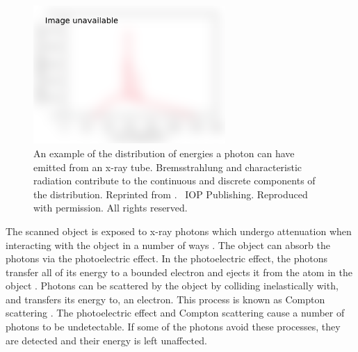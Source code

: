 \begin{figure}
  \centering
  \includegraphics[width=0.65\textwidth]{../figures/literatureReview/literature_spectrum.png}
  \caption{An example of the distribution of energies a photon can have emitted from an x-ray tube. Bremsstrahlung and characteristic radiation contribute to the continuous and discrete components of the distribution. Reprinted from \cite{michael2001x}. \textcopyright\ IOP Publishing. Reproduced with permission. All rights reserved.}
  \label{fig:literature_spectrum}
\end{figure}

The scanned object is exposed to x-ray photons which undergo attenuation when interacting with the object in a number of ways \citep{cantatore2011introduction}. The object can absorb the photons via the photoelectric effect. In the photoelectric effect, the photons transfer all of its energy to a bounded electron and ejects it from the atom in the object \citep{millikan1916direct}. Photons can be scattered by the object by colliding inelastically with, and transfers its energy to, an electron. This process is known as Compton scattering \citep{compton1923quantum}. The photoelectric effect and Compton scattering cause a number of photons to be undetectable. If some of the photons avoid these processes, they are detected and their energy is left unaffected.

